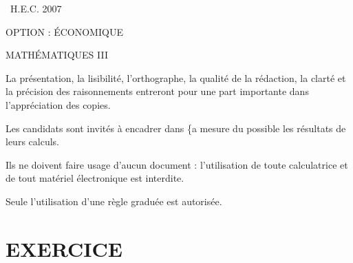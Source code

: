 \documentclass[11pt]{article}%
\begin{document}
\begin{center}
{\Huge \ H.E.C. 2007}

{\LARGE OPTION : ÉCONOMIQUE}

{\Huge MATHÉMATIQUES III }
\end{center}

La présentation, la lisibilité, l'orthographe, la qualité de la
rédaction, la clarté et la précision des raisonnements entreront
pour une part importante dans l'appréciation des copies.

Les candidats sont invités à encadrer dans \{a mesure du possible
les résultats de leurs calculs.

Ils ne doivent faire usage d'aucun document : l'utilisation de toute
calculatrice et de tout matériel électronique est interdite.

Seule l'utilisation d'une règle graduée est autorisée.

\section*{EXERCICE}
\end{document}
